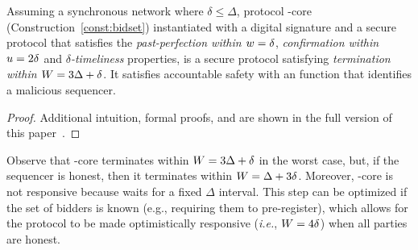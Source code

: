 




\begin{theorem}\label{thm:bidset-construction-secure}
Assuming a synchronous network where $\delta \leq \Delta$,
protocol \bidsettm-core (Construction~\ref{const:bidset}) instantiated with a digital signature and a  secure \podtm protocol that satisfies the \emph{past-perfection within $w = \delta$}, \emph{confirmation within $u=2\delta$} and \emph{$\delta$-timeliness} properties, is a secure \bidsettm protocol satisfying \emph{termination within $W = 3\Delta + \delta$}.
It satisfies accountable safety with an \identifySequencer{} function that identifies a malicious sequencer.
\end{theorem}
\vspace{-3mm}
\begin{proof} Additional intuition, formal proofs, and \identifySequencer{} are shown in the full version of this paper~\cite[Appendix D]{DBLP:journals/corr/abs-2501-14931}.
\end{proof}

\begin{remark}
    Observe that \bidsettm-core terminates within $W = 3\Delta + \delta$ in the worst case, but, if the sequencer is honest, then it terminates within $W = \Delta + 3\delta$.
    Moreover, \bidsettm-core is not responsive because  waits for a fixed $\Delta$ interval.
    This step can be optimized if the set of bidders is known (e.g., requiring them to pre-register), which allows for the protocol to be made optimistically responsive (\textit{i.e.}, $W = 4\delta$) when all parties are honest.
\end{remark}

